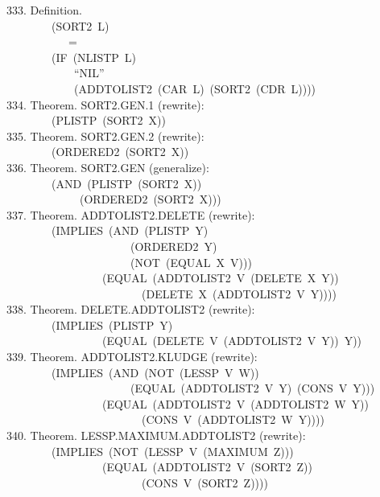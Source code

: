 \documentclass[10pt]{book}
\newenvironment{pubasis}{\begin{flushleft}}{\end{flushleft}}
\begin{document}
\begin{pubasis}
333.    Definition.\\
~~~~~~~~(SORT2~L)\\
~~~~~~~~~~~=\\
~~~~~~~~(IF~(NLISTP~L)\\
~~~~~~~~~~~~``NIL''\\
~~~~~~~~~~~~(ADDTOLIST2~(CAR~L)~(SORT2~(CDR~L))))\\

334.    Theorem.  SORT2.GEN.1 (rewrite):\\
~~~~~~~~(PLISTP~(SORT2~X))\\

335.    Theorem.  SORT2.GEN.2 (rewrite):\\
~~~~~~~~(ORDERED2~(SORT2~X))\\

336.    Theorem.  SORT2.GEN (generalize):\\
~~~~~~~~(AND~(PLISTP~(SORT2~X))\\
~~~~~~~~~~~~~(ORDERED2~(SORT2~X)))\\

337.    Theorem.  ADDTOLIST2.DELETE (rewrite):\\
~~~~~~~~(IMPLIES~(AND~(PLISTP~Y)\\
~~~~~~~~~~~~~~~~~~~~~~(ORDERED2~Y)\\
~~~~~~~~~~~~~~~~~~~~~~(NOT~(EQUAL~X~V)))\\
~~~~~~~~~~~~~~~~~(EQUAL~(ADDTOLIST2~V~(DELETE~X~Y))\\
~~~~~~~~~~~~~~~~~~~~~~~~(DELETE~X~(ADDTOLIST2~V~Y))))\\

338.    Theorem.  DELETE.ADDTOLIST2 (rewrite):\\
~~~~~~~~(IMPLIES~(PLISTP~Y)\\
~~~~~~~~~~~~~~~~~(EQUAL~(DELETE~V~(ADDTOLIST2~V~Y))~Y))\\

339.    Theorem.  ADDTOLIST2.KLUDGE (rewrite):\\
~~~~~~~~(IMPLIES~(AND~(NOT~(LESSP~V~W))\\
~~~~~~~~~~~~~~~~~~~~~~(EQUAL~(ADDTOLIST2~V~Y)~(CONS~V~Y)))\\
~~~~~~~~~~~~~~~~~(EQUAL~(ADDTOLIST2~V~(ADDTOLIST2~W~Y))\\
~~~~~~~~~~~~~~~~~~~~~~~~(CONS~V~(ADDTOLIST2~W~Y))))\\

340.    Theorem.  LESSP.MAXIMUM.ADDTOLIST2 (rewrite):\\
~~~~~~~~(IMPLIES~(NOT~(LESSP~V~(MAXIMUM~Z)))\\
~~~~~~~~~~~~~~~~~(EQUAL~(ADDTOLIST2~V~(SORT2~Z))\\
~~~~~~~~~~~~~~~~~~~~~~~~(CONS~V~(SORT2~Z))))\\


\end{pubasis}
\end{document}
